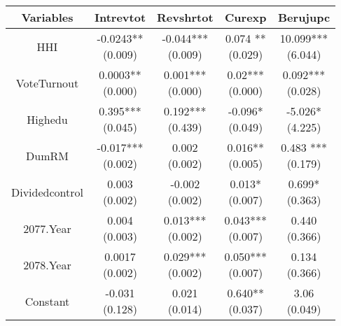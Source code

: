 \begin{table}[h!]
\centering
\begin{tabular}{|ccccc|}
\hline
\textbf{Variables} & \textbf{Intrevtot} & \textbf{Revshrtot} & \textbf{Curexp} & \textbf{Berujupc} \\
\hline
HHI & \makecell{-0.0243** \\ (0.009)} & \makecell{-0.044*** \\ (0.009)} & \makecell{0.074 **\\ (0.029)} & \makecell{10.099*** \\ (6.044)} \\

VoteTurnout& \makecell{0.0003** \\ (0.000)} & \makecell{0.001*** \\ (0.000)} & \makecell{0.02***\\ (0.000)} & \makecell{0.092*** \\ (0.028)} \\

Highedu & \makecell{0.395*** \\ (0.045)} & \makecell{0.192*** \\ (0.439)} & \makecell{-0.096* \\ (0.049)} & \makecell{-5.026* \\ (4.225)} \\
DumRM & \makecell{-0.017*** \\ (0.002)} & \makecell{0.002\\ (0.002)} & \makecell{0.016**\\ (0.005)} & \makecell{0.483 ***\\ (0.179)} \\
Dividedcontrol & \makecell{0.003 \\ (0.002)} & \makecell{-0.002\\ (0.002)} & \makecell{0.013*\\ (0.007)} & \makecell{0.699*\\ (0.363)} \\
2077.Year& \makecell{0.004 \\ (0.003)} & \makecell{0.013***\\ (0.002)} & \makecell{0.043***\\ (0.007)} & \makecell{0.440\\ (0.366)} \\
2078.Year & \makecell{0.0017 \\ (0.002)} & \makecell{0.029***\\ (0.002)} & \makecell{0.050***\\ (0.007)} & \makecell{0.134\\ (0.366)} \\
Constant & \makecell{-0.031 \\ (0.128)} & \makecell{0.021 \\ (0.014)} & \makecell{0.640** \\ (0.037)} & \makecell{3.06 \\ (0.049)} \\\hline


\end{tabular}
\end{table}
